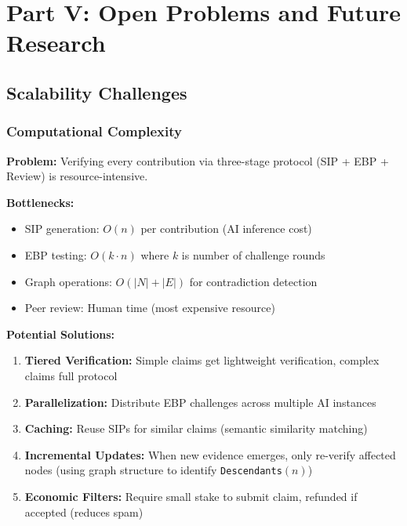 \documentclass[11pt,a4paper]{article}
\theoremstyle{definition}
\theoremstyle{remark}
\newcommand{\SIP}{\textsc{SIP}}
\newcommand{\EBP}{\textsc{EBP}}
\begin{document}
\section{Part V: Open Problems and Future Research}

\subsection{Scalability Challenges}

\subsubsection{Computational Complexity}

\textbf{Problem:} Verifying every contribution via three-stage protocol (SIP + EBP + Review) is resource-intensive.

\textbf{Bottlenecks:}
\begin{itemize}
    \item \SIP{} generation: $O(n)$ per contribution (AI inference cost)
    \item \EBP{} testing: $O(k \cdot n)$ where $k$ is number of challenge rounds
    \item Graph operations: $O(|N| + |E|)$ for contradiction detection
    \item Peer review: Human time (most expensive resource)
\end{itemize}

\textbf{Potential Solutions:}
\begin{enumerate}
    \item \textbf{Tiered Verification:} Simple claims get lightweight verification, complex claims full protocol
    \item \textbf{Parallelization:} Distribute \EBP{} challenges across multiple AI instances
    \item \textbf{Caching:} Reuse \SIP{}s for similar claims (semantic similarity matching)
    \item \textbf{Incremental Updates:} When new evidence emerges, only re-verify affected nodes (using graph structure to identify \texttt{Descendants}$(n)$)
    \item \textbf{Economic Filters:} Require small stake to submit claim, refunded if accepted (reduces spam)
\end{enumerate}
\end{document}
